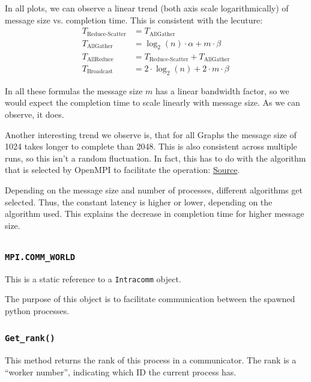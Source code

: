 \documentclass{article}
\begin{document}
    In all plots, we can observe a linear trend (both axis scale logarithmically) of message size vs. completion time. This is consistent with the lecuture:
    \begin{align*}
        T_{\text{Reduce-Scatter}} &= T_{\text{AllGather}}\\
        T_{\text{AllGather}} &= \log_2(n)\cdot \alpha + m\cdot \beta\\
        T_{\text{AllReduce}} &= T_{\text{Reduce-Scatter}} + T_{\text{AllGather}}\\
        T_{\text{Broadcast}} &= 2\cdot \log_2(n) + 2\cdot m \cdot \beta
    \end{align*}

    In all these formulas the message size $m$ has a linear bandwidth factor, so we would expect the completion time to scale linearly with message size. As we can observe, it does.
    
    Another interesting trend we observe is, that for all Graphs the message size of 1024 takes longer to complete than 2048. This is also consistent across multiple runs, so this isn't a random fluctuation.
    In fact, this has to do with the algorithm that is selected by OpenMPI to facilitate the operation: \href{https://github.com/open-mpi/ompi/blob/3a2e90895e15822912002be1e9aea8032c4c0bae/ompi/mca/coll/tuned/coll_tuned_decision_fixed.c\#L81-L215}{Source}. 
    
    Depending on the message size and number of processes, different algorithms get selected. Thus, the constant latency is higher or lower, depending on the algorithm used. This explains the decrease in completion time for higher message size.



    \subsection{}
    \subsubsection{\texttt{MPI.COMM\_WORLD}}
    This is a static reference to a \texttt{Intracomm} object.
    
    The purpose of this object is to facilitate communication between the spawned python processes.

    \subsubsection{\texttt{Get\_rank()}}
    This method returns the rank of this process in a communicator. The rank is a \enquote{worker number}, indicating which ID the current process has.
\end{document}
